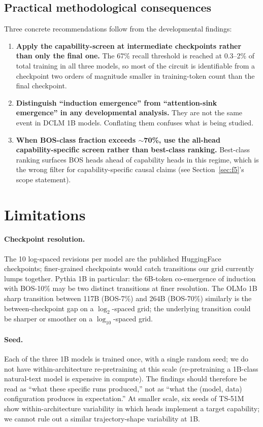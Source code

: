 \documentclass[11pt]{article}
\begin{document}
\subsection{Practical methodological consequences}

Three concrete recommendations follow from the developmental findings:

\begin{enumerate}
\item \textbf{Apply the capability-screen at intermediate checkpoints
      rather than only the final one.} The 67\% recall threshold is
      reached at 0.3--2\% of total training in all three models, so
      most of the circuit is identifiable from a checkpoint two orders
      of magnitude smaller in training-token count than the final
      checkpoint.
\item \textbf{Distinguish ``induction emergence'' from ``attention-sink
      emergence'' in any developmental analysis.} They are not the
      same event in DCLM 1B models. Conflating them confuses what is
      being studied.
\item \textbf{When BOS-class fraction exceeds $\sim$70\%, use the
      all-head capability-specific screen rather than best-class
      ranking.} Best-class ranking surfaces BOS heads ahead of
      capability heads in this regime, which is the wrong filter for
      capability-specific causal claims (see
      Section~\ref{sec:f5}'s scope statement).
\end{enumerate}

\section{Limitations}

\paragraph{Checkpoint resolution.} The 10 log-spaced revisions per model
are the published HuggingFace checkpoints; finer-grained checkpoints would
catch transitions our grid currently lumps together. Pythia 1B in
particular: the 6B-token co-emergence of induction with BOS-10\% may be
two distinct transitions at finer resolution. The OLMo 1B sharp transition
between 117B (BOS-7\%) and 264B (BOS-70\%) similarly is the
between-checkpoint gap on a $\log_2$-spaced grid; the underlying
transition could be sharper or smoother on a $\log_{10}$-spaced grid.

\paragraph{Seed.} Each of the three 1B models is trained once, with a
single random seed; we do not have within-architecture re-pretraining at
this scale (re-pretraining a 1B-class natural-text model is expensive in
compute). The findings should therefore be read as ``what these specific
runs produced,'' not as ``what the (model, data) configuration produces in
expectation.'' At smaller scale, six seeds of TS-51M
\citep{paper1_methodology} show within-architecture variability in which
heads implement a target capability; we cannot rule out a similar
trajectory-shape variability at 1B.
\end{document}
